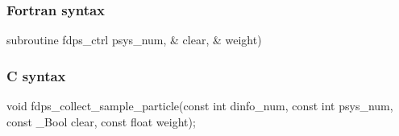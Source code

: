 \subsubsection*{Fortran syntax}
\begin{screen}
\begin{spverbatim}
subroutine fdps_ctrl%
                                             psys_num,  &
                                             clear,     &
                                             weight)
\end{spverbatim}
\end{screen}

\subsubsection*{C syntax}
\begin{screen}
\begin{spverbatim}
void fdps_collect_sample_particle(const int dinfo_num,
                                  const int psys_num,
                                  const _Bool clear,
                                  const float weight);
\end{spverbatim}
\end{screen}
\clearpage

